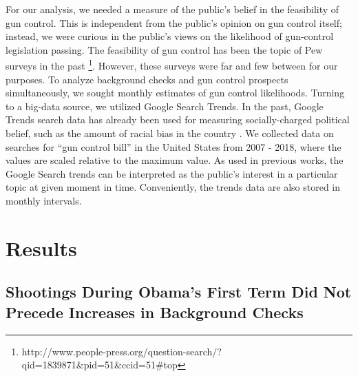 \documentclass[9pt,twocolumn,twoside,lineno]{pnas-new}
\begin{document}
For our analysis, we needed a measure of the public’s belief in the feasibility of gun control. This is independent from the public’s opinion on gun control itself; instead, we were curious in the public’s views on the likelihood of gun-control legislation passing. The feasibility of gun control has been the topic of Pew surveys in the past \footnote{http://www.people-press.org/question-search/?qid=1839871\&pid=51\&ccid=51\#top}. However, these surveys were far and few between for our purposes. To analyze background checks and gun control prospects simultaneously, we sought monthly estimates of gun control likelihoods. 
	Turning to a big-data source, we utilized Google Search Trends. In the past, Google Trends search data has already been used for measuring socially-charged political belief, such as the amount of racial bias in the country \cite{stephens-davidowitz_cost_2013}. We collected data on searches for “gun control bill” in the United States from 2007 - 2018, where the values are scaled relative to the maximum value. As used in previous works, the Google Search trends can be interpreted as the public’s interest in a particular topic at given moment in time. Conveniently, the trends data are also stored in monthly intervals. 

\section*{Results}

\subsection*{Shootings During Obama's First Term Did Not Precede Increases in Background Checks}
\end{document}
